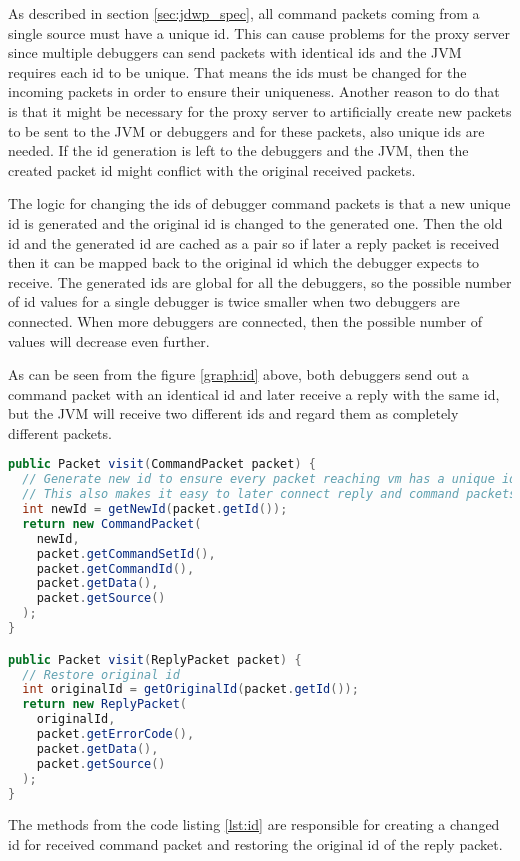 \documentclass[..thesis.tex]{subfiles}
\begin{document}
As described in section \ref{sec:jdwp_spec}, all command packets coming from a single source must have a unique id.
This can cause problems for the proxy server since multiple debuggers can send packets with identical ids and the JVM requires each id to be unique.
That means the ids must be changed for the incoming packets in order to ensure their uniqueness.
Another reason to do that is that it might be necessary for the proxy server to artificially create new packets to be sent to the JVM or debuggers and for these packets, also unique ids are needed.
If the id generation is left to the debuggers and the JVM, then the created packet id might conflict with the original received packets.

The logic for changing the ids of debugger command packets is that a new unique id is generated and the original id is changed to the generated one.
Then the old id and the generated id are cached as a pair so if later a reply packet is received then it can be mapped back to the original id which the debugger expects to receive.
The generated ids are global for all the debuggers, so the possible number of id values for a single debugger is twice smaller when two debuggers are connected.
When more debuggers are connected, then the possible number of values will decrease even further.



As can be seen from the figure \ref{graph:id} above, both debuggers send out a command packet with an identical id and later receive a reply with the same id, but the JVM will receive two different ids and regard them as completely different packets.

\begin{lstlisting}[language=java, caption={\textit{Visitor methods for processing the ids of received and written debugger packets.}}, captionpos=b, label={lst:id}]
public Packet visit(CommandPacket packet) {
  // Generate new id to ensure every packet reaching vm has a unique id
  // This also makes it easy to later connect reply and command packets and avoid collision
  int newId = getNewId(packet.getId());
  return new CommandPacket(
    newId,
    packet.getCommandSetId(), 
    packet.getCommandId(), 
    packet.getData(), 
    packet.getSource()
  );
}

public Packet visit(ReplyPacket packet) {
  // Restore original id
  int originalId = getOriginalId(packet.getId());
  return new ReplyPacket(
    originalId,
    packet.getErrorCode(), 
    packet.getData(), 
    packet.getSource()
  );
}
\end{lstlisting}

The  methods from the code listing \ref{lst:id} are responsible for creating a changed id for received command packet and restoring the original id of the reply packet.
\end{document}
